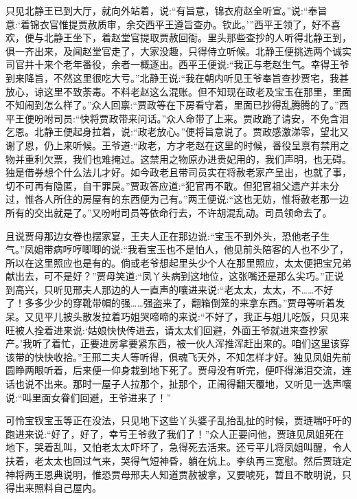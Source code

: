 \begin{parag}
    只见北静王已到大厅，就向外站着，说:“有旨意，锦衣府赵全听宣。”说:“奉旨意:‘着锦衣官惟提贾赦质审，余交西平王遵旨查办。钦此。’”西平王领了，好不喜欢，便与北静王坐下，着赵堂官提取贾赦回衙。里头那些查抄的人听得北静王到，俱一齐出来，及闻赵堂官走了，大家没趣，只得侍立听候。北静王便挑选两个诚实司官并十来个老年番役，余者一概逐出。西平王便说:“我正与老赵生气。幸得王爷到来降旨，不然这里很吃大亏。”北静王说:“我在朝内听见王爷奉旨查抄贾宅，我甚放心，谅这里不致荼毒。不料老赵这么混账。但不知现在政老及宝玉在那里，里面不知闹到怎么样了。”众人回禀:“贾政等在下房看守着，里面已抄得乱腾腾的了。”西平王便吩咐司员:“快将贾政带来问话。”众人命带了上来。贾政跪了请安，不免含泪乞恩。北静王便起身拉着，说:“政老放心。”便将旨意说了。贾政感激涕零，望北又谢了恩，仍上来听候。王爷道:“政老，方才老赵在这里的时候，番役呈禀有禁用之物并重利欠票，我们也难掩过。这禁用之物原办进贵妃用的，我们声明，也无碍。独是借券想个什么法儿才好。如今政老且带司员实在将赦老家产呈出，也就了事，切不可再有隐匿，自干罪戾。”贾政答应道:“犯官再不敢。但犯官祖父遗产并未分过，惟各人所住的房屋有的东西便为己有。”两王便说:“这也无妨，惟将赦老那一边所有的交出就是了。”又吩咐司员等依命行去，不许胡混乱动。司员领命去了。
\end{parag}


\begin{parag}
    且说贾母那边女眷也摆家宴，王夫人正在那边说:“宝玉不到外头，恐他老子生气。”凤姐带病哼哼唧唧的说:“我看宝玉也不是怕人，他见前头陪客的人也不少了，所以在这里照应也是有的。倘或老爷想起里头少个人在那里照应，太太便把宝兄弟献出去，可不是好？”贾母笑道:“凤丫头病到这地位，这张嘴还是那么尖巧。”正说到高兴，只听见邢夫人那边的人一直声的嚷进来说:“老太太，太太，不……不好了！多多少少的穿靴带帽的强……强盗来了，翻箱倒笼的来拿东西。”贾母等听着发呆。又见平儿披头散发拉着巧姐哭啼啼的来说:“不好了，我正与姐儿吃饭，只见来旺被人拴着进来说:‘姑娘快快传进去，请太太们回避，外面王爷就进来查抄家产。’我听了着忙，正要进房拿要紧东西，被一伙人浑推浑赶出来的。咱们这里该穿该带的快快收拾。”王邢二夫人等听得，俱魂飞天外，不知怎样才好。独见凤姐先前圆睁两眼听着，后来便一仰身栽到地下死了。贾母没有听完，便吓得涕泪交流，连话也说不出来。那时一屋子人拉那个，扯那个，正闹得翻天覆地，又听见一迭声嚷说:“叫里面女眷们回避，王爷进来了！”
\end{parag}


\begin{parag}
    可怜宝钗宝玉等正在没法，只见地下这些丫头婆子乱抬乱扯的时候，贾琏喘吁吁的跑进来说:“好了，好了，幸亏王爷救了我们了！”众人正要问他，贾琏见凤姐死在地下，哭着乱叫，又怕老太太吓坏了，急得死去活来。还亏平儿将凤姐叫醒，令人扶着，老太太也回过气来，哭得气短神昏，躺在炕上。李纨再三宽慰。然后贾琏定神将两王恩典说明，惟恐贾母邢夫人知道贾赦被拿，又要唬死，暂且不敢明说，只得出来照料自己屋内。
\end{parag}


